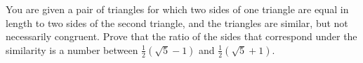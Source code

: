You are given a pair of triangles for which two sides of one triangle are equal in length to two sides of the second triangle, and the triangles are similar, but not necessarily congruent. Prove that the ratio of the sides that correspond under the similarity is a number between $ \frac {1}{2}(\sqrt {5} - 1)$ and $ \frac {1}{2}(\sqrt {5} + 1)$.